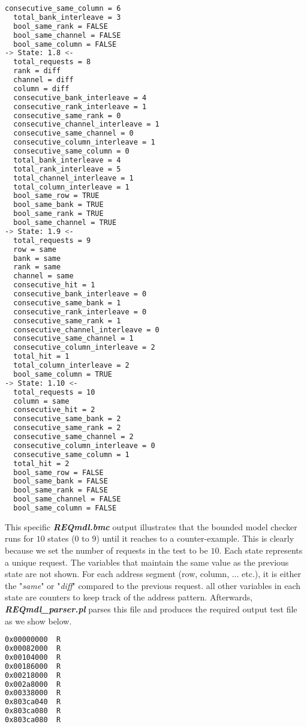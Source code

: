 \begin{lstlisting}[language=bash]
  consecutive_same_column = 6
  total_bank_interleave = 3
  bool_same_rank = FALSE
  bool_same_channel = FALSE
  bool_same_column = FALSE
-> State: 1.8 <-
  total_requests = 8
  rank = diff
  channel = diff
  column = diff
  consecutive_bank_interleave = 4
  consecutive_rank_interleave = 1
  consecutive_same_rank = 0
  consecutive_channel_interleave = 1
  consecutive_same_channel = 0
  consecutive_column_interleave = 1
  consecutive_same_column = 0
  total_bank_interleave = 4
  total_rank_interleave = 5
  total_channel_interleave = 1
  total_column_interleave = 1
  bool_same_row = TRUE
  bool_same_bank = TRUE
  bool_same_rank = TRUE
  bool_same_channel = TRUE
-> State: 1.9 <-
  total_requests = 9
  row = same
  bank = same
  rank = same
  channel = same
  consecutive_hit = 1
  consecutive_bank_interleave = 0
  consecutive_same_bank = 1
  consecutive_rank_interleave = 0
  consecutive_same_rank = 1
  consecutive_channel_interleave = 0
  consecutive_same_channel = 1
  consecutive_column_interleave = 2
  total_hit = 1
  total_column_interleave = 2
  bool_same_column = TRUE
-> State: 1.10 <-
  total_requests = 10
  column = same
  consecutive_hit = 2
  consecutive_same_bank = 2
  consecutive_same_rank = 2
  consecutive_same_channel = 2
  consecutive_column_interleave = 0
  consecutive_same_column = 1
  total_hit = 2
  bool_same_row = FALSE
  bool_same_bank = FALSE
  bool_same_rank = FALSE
  bool_same_channel = FALSE
  bool_same_column = FALSE
\end{lstlisting}
This specific \textbf{\textit{REQmdl.bmc}} output illustrates that the bounded model checker runs for $10$ states ($0$ to $9$) until it reaches to a counter-example. 
This is clearly because we set the number of requests in the test to be $10$. 
Each state represents a unique request. 
The variables that maintain the same value as the previous state are not shown. 
For each address segment (row, column, ... etc.), it is either the "\textit{same}" or "\textit{diff}" compared to the previous request. 
all other variables in each state are counters to keep track of the address pattern. 
Afterwards, \textbf{\textit{REQmdl\_parser.pl}} parses this file and produces the required output test file as we show below. 
\begin{lstlisting}[language=bash]
0x00000000	R
0x00082000	R
0x00104000	R
0x00186000	R
0x00218000	R
0x002a8000	R
0x00338000	R
0x803ca040	R
0x803ca080	R
0x803ca080	R
\end{lstlisting} 

